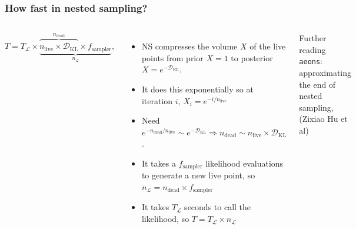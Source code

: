 \documentclass[aspectratio=169]{beamer}
\begin{document}
\begin{frame}
    \frametitle{How fast in nested sampling?}
    \begin{columns}
        \[
            \boxed{
                T = T_\mathcal{L} \times \underbrace{
                    \overbrace{
                        n_\text{live}  \times \mathcal{D}_\text{KL}
                    }^{\displaystyle n_\text{dead}}
                    \times f_\text{sampler}
                }_{\displaystyle n_\mathcal{L}},
            }
        \]
        \vspace{-10pt}
        \begin{itemize}
            \item NS compresses the volume $X$ of the live points from prior $X=1$ to posterior $X = e^{-\mathcal{D}_\text{KL}}$.
            \item It does this exponentially so at iteration $i$, $X_i = e^{-i/n_\text{live}}$
            \item Need $e^{-n_\text{dead}/n_\text{live}}\sim e^{-\mathcal{D}_\text{KL}}\Rightarrow \boxed{n_\text{dead}\sim n_\text{live}\times\mathcal{D}_\text{KL}}$.
            \item It takes a $f_\text{sampler}$ likelihood evaluations to generate a new live point, so $n_\mathcal{L} = n_\text{dead}\times f_\text{sampler}$
            \item It takes $T_\mathcal{L}$ seconds to call the likelihood, so $T=T_\mathcal{L}\times n_\mathcal{L}$
        \end{itemize}
        \begin{exampleblock}{Further reading~}
            \texttt{aeons}: approximating the end of nested sampling, (Zixiao Hu et al) 
        \end{exampleblock}
        \vspace{8pt}
        \includegraphics[width=\textwidth,page=1]{figures/himmelblau}

\end{columns}
\end{frame}
\end{document}
